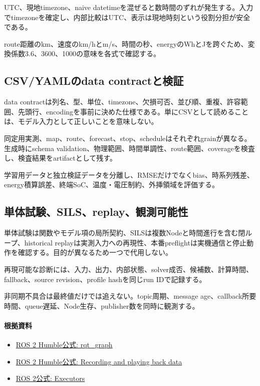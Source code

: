 \documentclass[a4paper,11pt]{article}
\begin{document}
UTC、現地timezone、naive datetimeを混ぜると数時間のずれが発生する。入力でtimezoneを確定し、内部比較はUTC、表示は現地時刻という役割分担が安全である。


route距離のkm、速度のkm/hとm/s、時間の秒、energyのWhとJを跨ぐため、変換係数3.6、3600、1000の意味を各式で確認する。



\subsection{CSV/YAMLのdata contractと検証}
data contractは列名、型、単位、timezone、欠損可否、並び順、重複、許容範囲、先頭行、encodingを事前に決めた仕様である。単にCSVとして読めることは、モデル入力として正しいことを意味しない。


同定用実測、map、route、forecast、stop、scheduleはそれぞれgrainが異なる。生成時にschema validation、物理範囲、時間単調性、route範囲、coverageを検査し、検査結果をartifactとして残す。


学習用データと独立検証データを分離し、RMSEだけでなくbias、時系列残差、energy積算誤差、終端SoC、温度・電圧制約、外挿領域を評価する。



\subsection{単体試験、SILS、replay、観測可能性}
単体試験は関数やモデル項の局所契約、SILSは複数Nodeと時間進行を含む閉ループ、historical replayは実測入力への再現性、本番preflightは実機通信と停止動作を確認する。目的が異なるため一つで代用しない。


再現可能な診断には、入力、出力、内部状態、solver成否、候補数、計算時間、fallback、source revision、profile hashを同じrun IDで記録する。


非同期不具合は最終値だけでは追えない。topic周期、message age、callback所要時間、queue遅延、Node生存、publisher数を同時に観測する。

\paragraph{根拠資料}
\begin{itemize}[leftmargin=1.6em]
\item \href{https://docs.ros.org/en/ros2_packages/humble/api/rqt_graph/index.html}{ROS 2 Humble公式: rqt\_graph}
\item \href{https://docs.ros.org/en/humble/Tutorials/Beginner-CLI-Tools/Recording-And-Playing-Back-Data/Recording-And-Playing-Back-Data.html}{ROS 2 Humble公式: Recording and playing back data}
\item \href{https://docs.ros.org/en/rolling/Concepts/Intermediate/About-Executors.html}{ROS 2公式: Executors}
\end{itemize}
\end{document}
